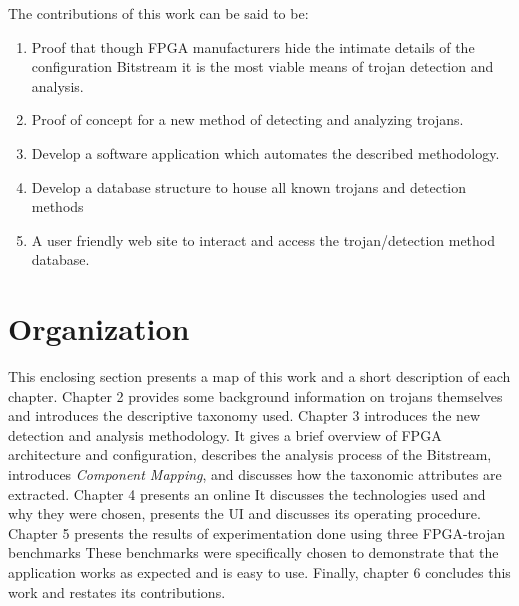 The contributions of this work can be said to be:
\begin{enumerate}
	\item Proof that though \acrshort{FPGA} manufacturers hide the intimate details of the configuration \gls{Bitstream} it is the most viable means of trojan detection and analysis. 
	\item Proof of concept for a new method of detecting and analyzing trojans.
	\item Develop a software application which automates the described methodology.
	\item Develop a database structure to house all known trojans and detection methods
	\item A user friendly web site to interact and access the trojan/detection method database.
\end{enumerate}
\section{Organization}
This enclosing section presents a map of this work and a short description of each chapter.
Chapter 2 provides some background information on trojans themselves and introduces the descriptive taxonomy used.
Chapter 3 introduces the new detection and analysis methodology.
It gives a brief overview of \acrshort{FPGA} architecture and configuration, describes the analysis process of the \gls{Bitstream}, introduces \textit{Component Mapping}, and discusses how the taxonomic attributes are extracted.
Chapter 4 presents an online 
It discusses the technologies used and why they were chosen, presents the \acrlong{UI} and discusses its operating procedure.
Chapter 5 presents the results of experimentation done using three \acrshort{FPGA}-trojan benchmarks
These benchmarks were specifically chosen to demonstrate that the application works as expected and is easy to use.
Finally, chapter 6 concludes this work and restates its contributions.
